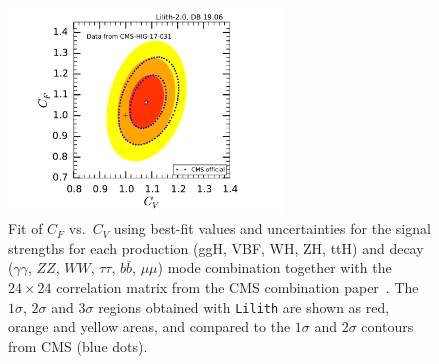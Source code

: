 \begin{figure}[hbt!]\centering
\includegraphics[width=0.65\textwidth]{validation/CMS/HIG-17-031-CVCF.pdf}%
\vspace*{-2mm}
\caption{Fit of $C_F$ vs.\ $C_V$ using best-fit values and uncertainties for the signal strengths for each production (ggH, VBF, WH, ZH, ttH) 
and decay ($\gamma\gamma$, $ZZ$, $WW$, $\tau\tau$, $b\bar b$, $\mu\mu$) mode combination together with the 
$24\times 24$ correlation matrix from the CMS combination paper~\cite{Sirunyan:2018koj}. 
The  $1\sigma$,  $2\sigma$ and $3\sigma$ regions obtained with {\tt Lilith} are shown as red, orange and yellow areas, 
and compared to the $1\sigma$ and $2\sigma$ contours from CMS (blue dots).}
\label{fig:validation_cms_combination}
\end{figure}

